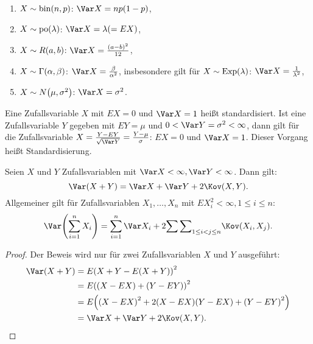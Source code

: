 \documentclass{lecture}
\begin{document}
    \begin{example}
        \begin{enumerate}
            \item \(X \sim \bin\parentheses*{n, p}\): \(\Var X = np\parentheses*{1 - p}\),
            \item \(X \sim \po\parentheses*{\lambda}\): \(\Var X = \lambda \parentheses*{= EX}\),
            \item \(X \sim R\parentheses*{a, b}\): \(\Var X = \frac{\parentheses*{a - b}^2}{12}\),
            \item \(X \sim \Gamma\parentheses*{\alpha, \beta}\): \(\Var X = \frac{\beta}{\alpha^2}\), insbesondere gilt für \(X \sim \Exp\parentheses*{\lambda}\): \(\Var X = \frac{1}{\lambda^2}\),
            \item \(X \sim N\parentheses*{\mu, \sigma^2}\): \(\Var X = \sigma^2\).
        \end{enumerate}
    \end{example}
    
    \begin{remark}
        Eine Zufallsvariable \(X\) mit \(EX = 0\) und \(\Var X = 1\) heißt standardisiert.
        Ist eine Zufallsvariable \(Y\) gegeben mit \(EY = \mu\) und \(0 < \Var Y = \sigma^2 < \infty\), dann gilt für die Zufallsvariable \(X = \frac{Y - EY}{\sqrt{\Var Y}} = \frac{Y - \mu}{\sigma}\): \(EX = 0\) und \(\Var X = 1\).
        Dieser Vorgang heißt Standardisierung.
    \end{remark}
    
    \begin{lemma}
        Seien \(X\) und \(Y\) Zufallsvariablen mit \(\Var X < \infty, \Var Y < \infty\).
        Dann gilt:
        \[
            \Var\parentheses*{X + Y} = \Var X + \Var Y + 2\Kov\parentheses*{X, Y}.
        \]
        Allgemeiner gilt für Zufallsvariablen \(X_1, \ldots, X_n\) mit \(EX_i^2 < \infty, 1 \le i \le n\):
        \[
            \Var\parentheses*{\sum_{i = 1}^n X_i} = \sum_{i = 1}^n \Var X_i + 2 {\sum\sum}_{1 \le i < j \le n}\Kov\parentheses*{X_i, X_j}.
        \]
    \end{lemma}
    
    \begin{proof}
        Der Beweis wird nur für zwei Zufallsvariablen \(X\) und \(Y\) ausgeführt:
        \begin{align*}
            \Var\parentheses*{X + Y} &= E\parentheses*{X + Y - E\parentheses*{X + Y}}^2\\
            &= E\parentheses*{\parentheses*{X - EX} + \parentheses*{Y - EY}}^2\\
            &= E\parentheses*{\parentheses*{X - EX}^2 + 2\parentheses*{X - EX}\parentheses*{Y - EX} + \parentheses*{Y - EY}^2}\\
            &= \Var X + \Var Y + 2\Kov\parentheses*{X, Y}.
        \end{align*}
    \end{proof}
\end{document}
